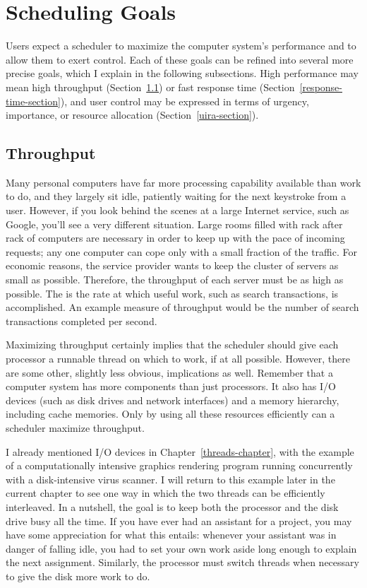 \section{Scheduling Goals}\label{scheduling-goals-section}

Users expect a scheduler to maximize the computer system's
performance and to allow them to exert control.  Each of these goals
can be refined into several more precise goals, which I explain in the
following subsections.  High performance may mean high throughput
(Section~\ref{throughput-section}) or fast response time
(Section~\ref{response-time-section}), and user control may be
expressed in terms of urgency, importance, or resource allocation
(Section~\ref{uira-section}).

\subsection{Throughput}\label{throughput-section}
Many personal computers have far more processing capability available
than work to do, and they largely sit idle, patiently waiting for the next
keystroke from a user.  However, if you look behind the scenes at a large
Internet service, such as Google, you'll see a very different
situation.  Large rooms filled with rack after rack of
computers are necessary in order to keep up with the pace of incoming
requests; any one computer can cope only with a small fraction of the
traffic.  For economic reasons, the service provider wants to keep the
cluster of servers as small as possible.  Therefore, the throughput of
each server must be as high as possible.  The  is the rate
at which useful work, such as search transactions, is accomplished.
An example measure of throughput would be the number of search
transactions completed per second.

Maximizing throughput certainly implies that the scheduler should give
each processor a runnable thread on which to work, if at all possible.
However, there are some other, slightly less obvious, implications as
well.  Remember that a computer system has more components than just
processors.  It also has I/O devices (such as disk drives and network
interfaces) and a memory hierarchy, including cache memories.  Only by
using all these resources efficiently can a scheduler maximize
throughput.

I already mentioned I/O devices in Chapter~\ref{threads-chapter}, with the
example of a computationally intensive graphics rendering program
running concurrently with a disk-intensive virus scanner.  I will return
to this example later in the current chapter to see one way in which
the two threads can be efficiently interleaved.  In a nutshell, the
goal is to keep both the processor and the disk drive busy all the
time.  If you have ever had an assistant for a project, you may have some
appreciation for what this entails: whenever your assistant was in danger
of falling idle, you had to set your own work aside long enough to
explain the next assignment.  Similarly, the processor must switch
threads when necessary to give the disk more work to do.

